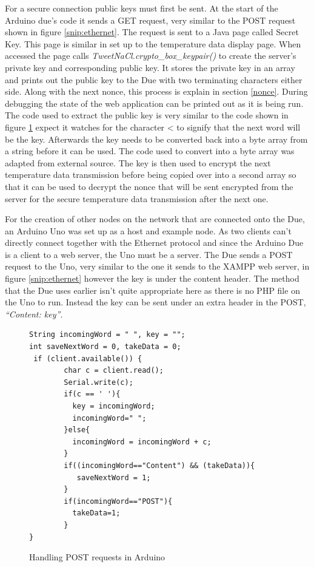 For a secure connection public keys must first be sent. At the start of the Arduino due's code it sends a GET request, very similar to the POST request shown in figure \ref{snip:ethernet}. The request is sent to a Java page called Secret Key. This page is similar in set up to the temperature data display page. When accessed the page calls \emph{TweetNaCl.crypto\_box\_keypair()} to create the server's private key and corresponding public key. It stores the private key in an array and prints out the public key to the Due with two terminating characters either side. Along with the next nonce, this process is explain in section \ref{nonce}. During debugging the state of the web application can be printed out as it is being run. The code used to extract the public key is very similar to the code shown in figure \ref{snip:post} expect it watches for the character < to signify that the next word will be the key. Afterwards the key needs to be converted back into a byte array from a string before it can be used. The code used to convert into a byte array was adapted from external source\cite{String2}. The key is then used to encrypt the next temperature data transmission before being copied over into a second array so that it can be used to decrypt the nonce that will be sent encrypted from the server for the secure temperature data transmission after the next one. 

For the creation of other nodes on the network that are connected onto the Due, an Arduino Uno was set up as a host and example node. As two clients can't directly connect together with the Ethernet protocol and since the Arduino Due is a client to a web server, the Uno must be a server.
The Due sends a POST request to the Uno, very similar to the one it sends to the XAMPP web server, in figure \ref{snip:ethernet} however the key is under the content header. The method that the Due uses earlier isn't quite appropriate here as there is no PHP file on the Uno to run. Instead the key can be sent under an extra header in the POST, \emph{``Content: key''}.

\begin{figure}[H]
\begin{lstlisting}[style=Arduino]
String incomingWord = " ", key = "";
int saveNextWord = 0, takeData = 0;
 if (client.available()) {
        char c = client.read();
        Serial.write(c);
        if(c == ' '){
          key = incomingWord;
          incomingWord=" ";
        }else{
          incomingWord = incomingWord + c;
        }
        if((incomingWord=="Content") && (takeData)){
           saveNextWord = 1; 
        }
        if(incomingWord=="POST"){
          takeData=1;
        }
}
\end{lstlisting}
\caption{Handling POST requests in Arduino}
\label{snip:post}
\end{figure}

